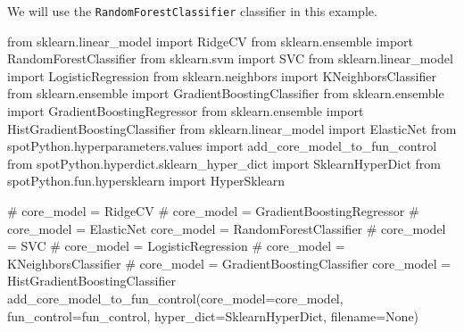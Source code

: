 \documentclass[
  letterpaper,
  DIV=11,
  numbers=noendperiod]{scrreprt}
\newenvironment{Shaded}{\begin{snugshade}}{\end{snugshade}}
\newcommand{\CommentTok}[1]{\textcolor[rgb]{0.37,0.37,0.37}{#1}}
\newcommand{\ImportTok}[1]{\textcolor[rgb]{0.00,0.46,0.62}{#1}}
\newcommand{\NormalTok}[1]{\textcolor[rgb]{0.00,0.23,0.31}{#1}}
\newcommand{\OperatorTok}[1]{\textcolor[rgb]{0.37,0.37,0.37}{#1}}
\newcommand{\VariableTok}[1]{\textcolor[rgb]{0.07,0.07,0.07}{#1}}
\begin{document}
We will use the \texttt{RandomForestClassifier} classifier in this
example.

\begin{Shaded}
\begin{Highlighting}[]
\ImportTok{from}\NormalTok{ sklearn.linear\_model }\ImportTok{import}\NormalTok{ RidgeCV}
\ImportTok{from}\NormalTok{ sklearn.ensemble }\ImportTok{import}\NormalTok{ RandomForestClassifier}
\ImportTok{from}\NormalTok{ sklearn.svm }\ImportTok{import}\NormalTok{ SVC}
\ImportTok{from}\NormalTok{ sklearn.linear\_model }\ImportTok{import}\NormalTok{ LogisticRegression}
\ImportTok{from}\NormalTok{ sklearn.neighbors }\ImportTok{import}\NormalTok{ KNeighborsClassifier}
\ImportTok{from}\NormalTok{ sklearn.ensemble }\ImportTok{import}\NormalTok{ GradientBoostingClassifier}
\ImportTok{from}\NormalTok{ sklearn.ensemble }\ImportTok{import}\NormalTok{ GradientBoostingRegressor}
\ImportTok{from}\NormalTok{ sklearn.ensemble }\ImportTok{import}\NormalTok{ HistGradientBoostingClassifier}
\ImportTok{from}\NormalTok{ sklearn.linear\_model }\ImportTok{import}\NormalTok{ ElasticNet}
\ImportTok{from}\NormalTok{ spotPython.hyperparameters.values }\ImportTok{import}\NormalTok{ add\_core\_model\_to\_fun\_control}
\ImportTok{from}\NormalTok{ spotPython.hyperdict.sklearn\_hyper\_dict }\ImportTok{import}\NormalTok{ SklearnHyperDict}
\ImportTok{from}\NormalTok{ spotPython.fun.hypersklearn }\ImportTok{import}\NormalTok{ HyperSklearn}
\end{Highlighting}
\end{Shaded}

\begin{Shaded}
\begin{Highlighting}[]
\CommentTok{\# core\_model  = RidgeCV}
\CommentTok{\# core\_model = GradientBoostingRegressor}
\CommentTok{\# core\_model = ElasticNet}
\NormalTok{core\_model }\OperatorTok{=}\NormalTok{ RandomForestClassifier}
\CommentTok{\# core\_model = SVC}
\CommentTok{\# core\_model = LogisticRegression}
\CommentTok{\# core\_model = KNeighborsClassifier}
\CommentTok{\# core\_model = GradientBoostingClassifier}
\NormalTok{core\_model }\OperatorTok{=}\NormalTok{ HistGradientBoostingClassifier}
\NormalTok{add\_core\_model\_to\_fun\_control(core\_model}\OperatorTok{=}\NormalTok{core\_model,}
\NormalTok{                              fun\_control}\OperatorTok{=}\NormalTok{fun\_control,}
\NormalTok{                              hyper\_dict}\OperatorTok{=}\NormalTok{SklearnHyperDict,}
\NormalTok{                              filename}\OperatorTok{=}\VariableTok{None}\NormalTok{)}
\end{Highlighting}
\end{Shaded}
\end{document}
